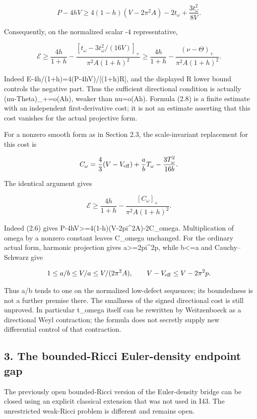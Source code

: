 \documentclass[
  10pt,
]{article}
\begin{document}
\[
 P-4hV\ge4(1-h)(V-2\pi^2A)-2t_\omega
                                    +\frac{3t_\omega^2}{8V}.
\]

Consequently, on the normalized scalar -4 representative,

\[
 \boxed{\mathcal E\ge\frac{4h}{1+h}
 -\frac{[t_\omega-3t_\omega^2/(16V)]_+}
             {\pi^2A(1+h)^2}
 \ge\frac{4h}{1+h}
 -\frac{(\nu-\Theta)_+}{\pi^2A(1+h)^2}.}             \tag{2.8}
\]

Indeed E-4h/(1+h)=4(P-4hV)/{[}(1+h)R{]}, and the displayed R lower bound
controls the negative part. Thus the sufficient directional condition is
actually (nu-Theta)\_+=o(Ah), weaker than nu=o(Ah). Formula (2.8) is a
finite estimate with an independent first-derivative cost; it is not an
estimate asserting that this cost vanishes for the actual projective
form.

For a nonzero smooth form as in Section 2.3, the scale-invariant
replacement for this cost is

\[
 C_\omega=\frac43(V-V_{\rm eff})+\frac abT_\omega
                         -\frac{3T_\omega^2}{16b}.
\]

The identical argument gives

\[
 \boxed{\mathcal E\ge\frac{4h}{1+h}
       -\frac{[C_\omega]_+}{\pi^2A(1+h)^2}.}         \tag{2.9}
\]

Indeed (2.6) gives P-4hV\textgreater=4(1-h)(V-2pi\^{}2A)-2C\_omega.
Multiplication of omega by a nonzero constant leaves C\_omega unchanged.
For the ordinary actual form, harmonic projection gives
a\textgreater=2pi\^{}2p, while b\textless=a and Cauchy--Schwarz give

\[
 1\le a/b\le V/a\le V/(2\pi^2A),\qquad
 V-V_{\rm eff}\le V-2\pi^2p.
\]

Thus a/b tends to one on the normalized low-defect sequences; its
boundedness is not a further premise there. The smallness of the signed
directional cost is still unproved. In particular t\_omega itself can be
rewritten by Weitzenboeck as a directional Weyl contraction; the formula
does not secretly supply new differential control of that contraction.

\hypertarget{the-bounded-ricci-euler-density-endpoint-gap}{%
\subsection{3. The bounded-Ricci Euler-density endpoint
gap}\label{the-bounded-ricci-euler-density-endpoint-gap}}

The previously open bounded-Ricci version of the Euler-density bridge
can be closed using an explicit classical extension that was not used in
I43. The unrestricted weak-Ricci problem is different and remains open.
\end{document}
